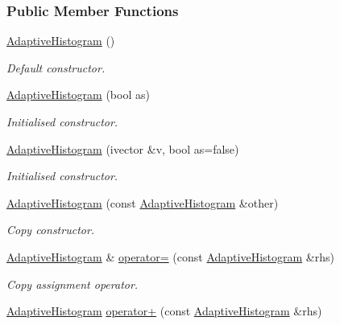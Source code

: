 \subsubsection*{\-Public \-Member \-Functions}
\begin{DoxyCompactItemize}
\item 
\hyperlink{classsubpavings_1_1AdaptiveHistogram_aa863ff24ef4af6b084f515f702bbe09e}{\-Adaptive\-Histogram} ()
\begin{DoxyCompactList}\small\item\em \-Default constructor. \end{DoxyCompactList}\item 
\hyperlink{classsubpavings_1_1AdaptiveHistogram_a8155be0403adb23fe8c4232f95eb47f6}{\-Adaptive\-Histogram} (bool as)
\begin{DoxyCompactList}\small\item\em \-Initialised constructor. \end{DoxyCompactList}\item 
\hyperlink{classsubpavings_1_1AdaptiveHistogram_a54d9dd37b5a2d71ee4e94f2154140b44}{\-Adaptive\-Histogram} (ivector \&v, bool as=false)
\begin{DoxyCompactList}\small\item\em \-Initialised constructor. \end{DoxyCompactList}\item 
\hyperlink{classsubpavings_1_1AdaptiveHistogram_a512fa91574e1dbb992a6edcb77bf56c1}{\-Adaptive\-Histogram} (const \hyperlink{classsubpavings_1_1AdaptiveHistogram}{\-Adaptive\-Histogram} \&other)
\begin{DoxyCompactList}\small\item\em \-Copy constructor. \end{DoxyCompactList}\item 
\hyperlink{classsubpavings_1_1AdaptiveHistogram}{\-Adaptive\-Histogram} \& \hyperlink{classsubpavings_1_1AdaptiveHistogram_a3adb7a4fce51ec497ef30dea633249fd}{operator=} (const \hyperlink{classsubpavings_1_1AdaptiveHistogram}{\-Adaptive\-Histogram} \&rhs)
\begin{DoxyCompactList}\small\item\em \-Copy assignment operator. \end{DoxyCompactList}\item 
\hyperlink{classsubpavings_1_1AdaptiveHistogram}{\-Adaptive\-Histogram} \hyperlink{classsubpavings_1_1AdaptiveHistogram_a962f179df0a65d5f179930d00e65b70e}{operator+} (const \hyperlink{classsubpavings_1_1AdaptiveHistogram}{\-Adaptive\-Histogram} \&rhs)

\end{DoxyCompactItemize}
